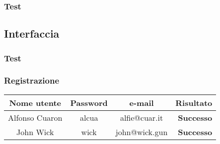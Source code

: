 \documentclass[12pt, a4paper]{article}
\begin{document}
\subsubsection{Test}
\subsection{Interfaccia}
\subsubsection{Test}
\subsubsection{Registrazione}
\begin{center}
\begin{tabular}{|c|c|c|r|}
\hline
\textbf{Nome utente} & \textbf{Password} & \textbf{e-mail} & \textbf{Risultato} \\
\hline
Alfonso Cuaron & alcua & alfie@cuar.it & \textbf{Successo} \\
John Wick & wick & john@wick.gun & \textbf{Successo} \\
\hline
\end{tabular}
\end{center}
\end{document}
